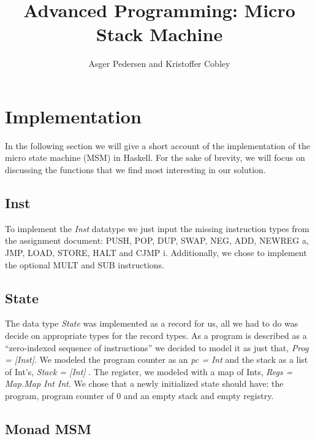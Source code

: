 \documentclass[]{article}
\title{Advanced Programming: Micro Stack Machine}
\author{ Asger Pedersen and Kristoffer Cobley}
\begin{document}
\ifpdf
{}
\else
{}
\fi

\maketitle
\setcounter{tocdepth}{1}
\tableofcontents
\newpage

\section{Implementation}

In the following section we will give a short account of the implementation of the micro state machine (MSM) in Haskell. For the sake of brevity, we will focus on discussing the functions that we find most interesting in our solution.\par

\subsection{Inst}

To implement the \emph{Inst} datatype we just input the missing instruction types from the assignment document: PUSH, POP, DUP, SWAP, NEG, ADD, NEWREG a, JMP, LOAD, STORE, HALT and CJMP i. Additionally, we chose to implement the optional MULT and SUB instructions. \par

\subsection{State}

The data type \emph{State} was implemented as a record for us, all we had to do was decide on appropriate types for the record types. As a program is described as a “zero-indexed sequence of instructions” we decided to model it as just that, \emph{Prog = [Inst]}. We modeled the program counter as an \emph{pc = Int} and the stack as a list of Int’s, \emph{Stack = [Int] }. The register, we modeled with a map of Ints, \emph{Regs = Map.Map Int Int}. 
We chose that a newly initialized state should have: the program, program counter of 0 and an empty stack and empty registry.\par

\subsection{Monad MSM}
\end{document}
